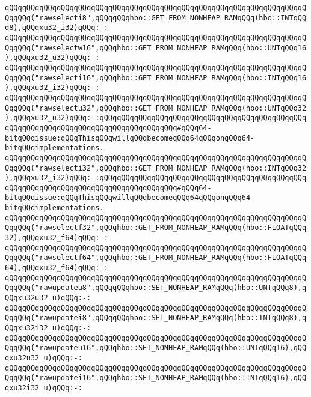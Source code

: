 \verb|qQQqqQQqqQQqqQQqqQQqqQQqqQQqqQQqqQQqqQQqqQQqqQQqqQQqqQQqqQQqqQQqqQQqqQQqqQQq("rawselecti8",qQQqqQQqhbo::GET_FROM_NONHEAP_RAMqQQq(hbo::INTqQQq8),qQQqxu32_i32)qQQq:-:|\newline
\verb|qQQqqQQqqQQqqQQqqQQqqQQqqQQqqQQqqQQqqQQqqQQqqQQqqQQqqQQqqQQqqQQqqQQqqQQqqQQq("rawselectw16",qQQqhbo::GET_FROM_NONHEAP_RAMqQQq(hbo::UNTqQQq16),qQQqxu32_u32)qQQq:-:|\newline
\verb|qQQqqQQqqQQqqQQqqQQqqQQqqQQqqQQqqQQqqQQqqQQqqQQqqQQqqQQqqQQqqQQqqQQqqQQqqQQq("rawselecti16",qQQqhbo::GET_FROM_NONHEAP_RAMqQQq(hbo::INTqQQq16),qQQqxu32_i32)qQQq:-:|\newline
\verb|qQQqqQQqqQQqqQQqqQQqqQQqqQQqqQQqqQQqqQQqqQQqqQQqqQQqqQQqqQQqqQQqqQQqqQQqqQQq("rawselectu32",qQQqhbo::GET_FROM_NONHEAP_RAMqQQq(hbo::UNTqQQq32),qQQqxu32_u32)qQQq:-:qQQqqQQqqQQqqQQqqQQqqQQqqQQqqQQqqQQqqQQqqQQqqQQqqQQqqQQqqQQqqQQqqQQqqQQqqQQqqQQqqQQqqQQq#qQQq64-bitqQQqissue:qQQqThisqQQqwillqQQqbecomeqQQq64qQQqonqQQq64-bitqQQqimplementations.|\newline
\verb|qQQqqQQqqQQqqQQqqQQqqQQqqQQqqQQqqQQqqQQqqQQqqQQqqQQqqQQqqQQqqQQqqQQqqQQqqQQq("rawselecti32",qQQqhbo::GET_FROM_NONHEAP_RAMqQQq(hbo::INTqQQq32),qQQqxu32_i32)qQQq:-:qQQqqQQqqQQqqQQqqQQqqQQqqQQqqQQqqQQqqQQqqQQqqQQqqQQqqQQqqQQqqQQqqQQqqQQqqQQqqQQqqQQqqQQq#qQQq64-bitqQQqissue:qQQqThisqQQqwillqQQqbecomeqQQq64qQQqonqQQq64-bitqQQqimplementations.|\newline
\verb|qQQqqQQqqQQqqQQqqQQqqQQqqQQqqQQqqQQqqQQqqQQqqQQqqQQqqQQqqQQqqQQqqQQqqQQqqQQq("rawselectf32",qQQqhbo::GET_FROM_NONHEAP_RAMqQQq(hbo::FLOATqQQq32),qQQqxu32_f64)qQQq:-:|\newline
\verb|qQQqqQQqqQQqqQQqqQQqqQQqqQQqqQQqqQQqqQQqqQQqqQQqqQQqqQQqqQQqqQQqqQQqqQQqqQQq("rawselectf64",qQQqhbo::GET_FROM_NONHEAP_RAMqQQq(hbo::FLOATqQQq64),qQQqxu32_f64)qQQq:-:|\newline
\newline
\verb|qQQqqQQqqQQqqQQqqQQqqQQqqQQqqQQqqQQqqQQqqQQqqQQqqQQqqQQqqQQqqQQqqQQqqQQqqQQq("rawupdateu8",qQQqqQQqhbo::SET_NONHEAP_RAMqQQq(hbo::UNTqQQq8),qQQqxu32u32_u)qQQq:-:|\newline
\verb|qQQqqQQqqQQqqQQqqQQqqQQqqQQqqQQqqQQqqQQqqQQqqQQqqQQqqQQqqQQqqQQqqQQqqQQqqQQq("rawupdatei8",qQQqqQQqhbo::SET_NONHEAP_RAMqQQq(hbo::INTqQQq8),qQQqxu32i32_u)qQQq:-:|\newline
\verb|qQQqqQQqqQQqqQQqqQQqqQQqqQQqqQQqqQQqqQQqqQQqqQQqqQQqqQQqqQQqqQQqqQQqqQQqqQQq("rawupdateu16",qQQqhbo::SET_NONHEAP_RAMqQQq(hbo::UNTqQQq16),qQQqxu32u32_u)qQQq:-:|\newline
\verb|qQQqqQQqqQQqqQQqqQQqqQQqqQQqqQQqqQQqqQQqqQQqqQQqqQQqqQQqqQQqqQQqqQQqqQQqqQQq("rawupdatei16",qQQqhbo::SET_NONHEAP_RAMqQQq(hbo::INTqQQq16),qQQqxu32i32_u)qQQq:-:|\newline
